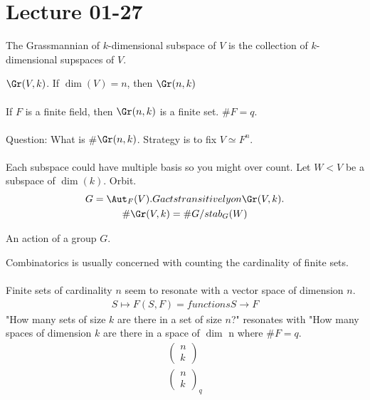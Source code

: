 \documentclass[class=scrartcl, crop=false]{standalone}
\date{2020-01-27}
\begin{document}
\section{Lecture 01-27}


\begin{definition}[Grassmannian]
  The Grassmannian of $k$-dimensional subspace of $V$ is the collection of $k$-dimensional supspaces of $V$.
  \begin{note}
    $\Gr(V, k)$. If $\dim(V) = n$, then $\Gr(n, k)$
    \\\\
    If  $F$ is a finite field, then $\Gr(n, k)$ is a finite set. $\#F = q$. 
    \\\\
    Question: What is \#$\Gr(n, k)$. Strategy is to fix $V \simeq F^n$.
    \\\\
    Each subspace could have multiple basis so you might over count. Let $W < V$ be a subspace of $\dim(k)$. Orbit. 
    \begin{gather*}
      G = \Aut_F(V). G acts transitively on \Gr(V, k). \\
      \#\Gr(V, k) = \#G / stab_G(W)
    \end{gather*} 
  \end{note} 
\end{definition} 

\begin{definition}
  An action of a group $G$. 
\end{definition} 

Combinatorics is usually concerned with counting the cardinality of finite sets.
\\\\
Finite sets of cardinality $n$ seem to resonate with a vector space of dimension $n$.
\begin{gather*}
  S \mapsto F(S, F) = functions S \to F
\end{gather*} 
"How many sets of size $k$ are there in a set of size $n$?" resonates with "How many spaces of dimension $k$ are there in a space of $\dim$ n where $\#F = q$.
\begin{gather*}
  \begin{pmatrix}
    n \\
    k
  \end{pmatrix} 
  \\
  \begin{pmatrix}
    n \\
    k
  \end{pmatrix}_q
\end{gather*} 
\end{document}
